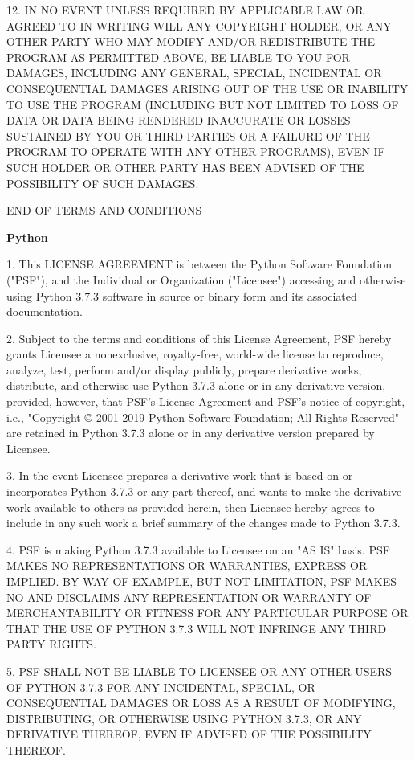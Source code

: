 12. IN NO EVENT UNLESS REQUIRED BY APPLICABLE LAW OR AGREED TO IN WRITING
WILL ANY COPYRIGHT HOLDER, OR ANY OTHER PARTY WHO MAY MODIFY AND/OR
REDISTRIBUTE THE PROGRAM AS PERMITTED ABOVE, BE LIABLE TO YOU FOR DAMAGES,
INCLUDING ANY GENERAL, SPECIAL, INCIDENTAL OR CONSEQUENTIAL DAMAGES ARISING
OUT OF THE USE OR INABILITY TO USE THE PROGRAM (INCLUDING BUT NOT LIMITED
TO LOSS OF DATA OR DATA BEING RENDERED INACCURATE OR LOSSES SUSTAINED BY
YOU OR THIRD PARTIES OR A FAILURE OF THE PROGRAM TO OPERATE WITH ANY OTHER
PROGRAMS), EVEN IF SUCH HOLDER OR OTHER PARTY HAS BEEN ADVISED OF THE
POSSIBILITY OF SUCH DAMAGES.

END OF TERMS AND CONDITIONS
 
 \textbf{Python}
 
1. This LICENSE AGREEMENT is between the Python Software Foundation ("PSF"), and
the Individual or Organization ("Licensee") accessing and otherwise using Python
3.7.3 software in source or binary form and its associated documentation.
 
2. Subject to the terms and conditions of this License Agreement, PSF hereby
grants Licensee a nonexclusive, royalty-free, world-wide license to reproduce,
analyze, test, perform and/or display publicly, prepare derivative works,
distribute, and otherwise use Python 3.7.3 alone or in any derivative
version, provided, however, that PSF's License Agreement and PSF's notice of
copyright, i.e., "Copyright © 2001-2019 Python Software Foundation; All Rights
Reserved" are retained in Python 3.7.3 alone or in any derivative version
prepared by Licensee.
 
3. In the event Licensee prepares a derivative work that is based on or
incorporates Python 3.7.3 or any part thereof, and wants to make the
derivative work available to others as provided herein, then Licensee hereby
agrees to include in any such work a brief summary of the changes made to Python
3.7.3.
 
4. PSF is making Python 3.7.3 available to Licensee on an "AS IS" basis.
PSF MAKES NO REPRESENTATIONS OR WARRANTIES, EXPRESS OR IMPLIED.  BY WAY OF
EXAMPLE, BUT NOT LIMITATION, PSF MAKES NO AND DISCLAIMS ANY REPRESENTATION OR
WARRANTY OF MERCHANTABILITY OR FITNESS FOR ANY PARTICULAR PURPOSE OR THAT THE
USE OF PYTHON 3.7.3 WILL NOT INFRINGE ANY THIRD PARTY RIGHTS.
 
5. PSF SHALL NOT BE LIABLE TO LICENSEE OR ANY OTHER USERS OF PYTHON 3.7.3
FOR ANY INCIDENTAL, SPECIAL, OR CONSEQUENTIAL DAMAGES OR LOSS AS A RESULT OF
MODIFYING, DISTRIBUTING, OR OTHERWISE USING PYTHON 3.7.3, OR ANY DERIVATIVE
THEREOF, EVEN IF ADVISED OF THE POSSIBILITY THEREOF.
 

